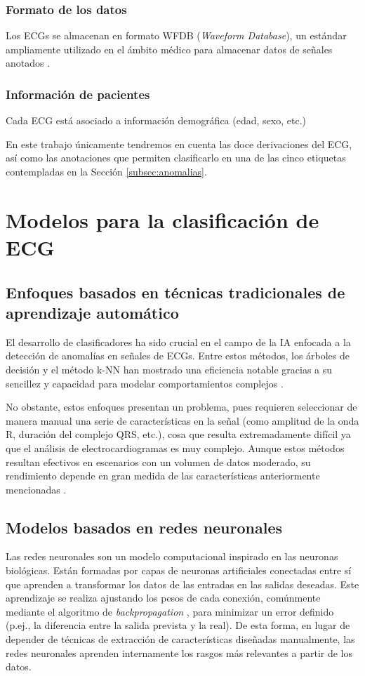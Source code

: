 	\subsubsection{Formato de los datos}
	Los ECGs se almacenan en formato WFDB (\emph{Waveform Database}), un estándar ampliamente utilizado en el ámbito médico para almacenar datos de señales anotados \citep{wfdb_spec}.
	
	\subsubsection{Información de pacientes}
	Cada ECG está asociado a información demográfica (edad, sexo, etc.)

En este trabajo únicamente tendremos en cuenta las doce derivaciones del ECG, así como las anotaciones que permiten clasificarlo en una de las cinco etiquetas contempladas en la Sección \ref{subsec:anomalias}.

\section{Modelos para la clasificación de ECG}
\subsection{Enfoques basados en técnicas tradicionales de aprendizaje automático}
El desarrollo de clasificadores ha sido crucial en el campo de la IA enfocada a la detección de anomalías en señales de ECGs. Entre estos métodos, los árboles de decisión y el método k-NN han mostrado una eficiencia notable gracias a su sencillez y capacidad para modelar comportamientos complejos \citep{guo2023machine}.

No obstante, estos enfoques presentan un problema, pues requieren seleccionar de manera manual una serie de características en la señal (como amplitud de la onda R, duración del complejo QRS, etc.), cosa que resulta extremadamente difícil ya que el análisis de electrocardiogramas es muy complejo. Aunque estos métodos resultan efectivos en escenarios con un volumen de datos moderado, su rendimiento depende en gran medida de las características anteriormente mencionadas \citep{acharya_2017}.

\subsection{Modelos basados en redes neuronales}
Las redes neuronales son un modelo computacional inspirado en las neuronas biológicas. Están formadas por capas de neuronas artificiales conectadas entre sí que aprenden a transformar los datos de las entradas en las salidas deseadas. Este aprendizaje se realiza ajustando los pesos de cada conexión, comúnmente mediante el algoritmo de \emph{backpropagation} \citep{backpropagation}, para minimizar un error definido (p.ej., la diferencia entre la salida prevista y la real). De esta forma, en lugar de depender de técnicas de extracción de características diseñadas manualmente, las redes neuronales aprenden internamente los rasgos más relevantes a partir de los datos.

